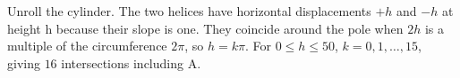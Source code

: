 Unroll the cylinder. The two helices have horizontal displacements $+h$ and $-h$ at height h because their slope is one. They coincide around the pole when $2h$ is a multiple of the circumference $2\pi$, so $h=k\pi$. For $0\le h\le50$, $k=0,1,\ldots,15$, giving $\boxed{16}$ intersections including A.
